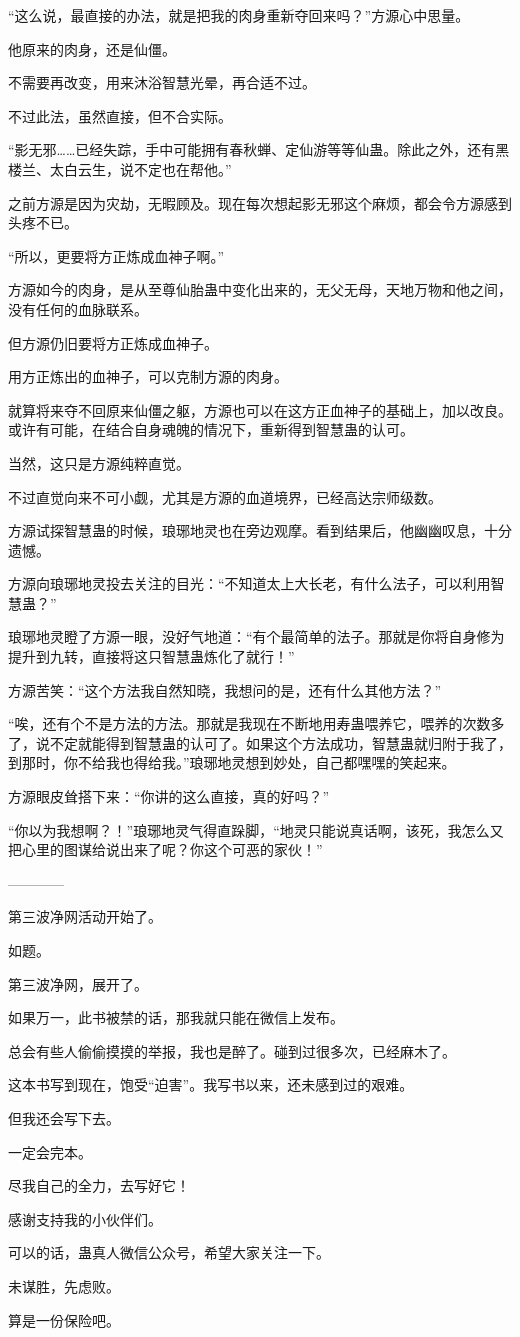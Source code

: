 \begin{this_body}
“这么说，最直接的办法，就是把我的肉身重新夺回来吗？”方源心中思量。

他原来的肉身，还是仙僵。

不需要再改变，用来沐浴智慧光晕，再合适不过。

不过此法，虽然直接，但不合实际。

“影无邪……已经失踪，手中可能拥有春秋蝉、定仙游等等仙蛊。除此之外，还有黑楼兰、太白云生，说不定也在帮他。”

之前方源是因为灾劫，无暇顾及。现在每次想起影无邪这个麻烦，都会令方源感到头疼不已。

“所以，更要将方正炼成血神子啊。”

方源如今的肉身，是从至尊仙胎蛊中变化出来的，无父无母，天地万物和他之间，没有任何的血脉联系。

但方源仍旧要将方正炼成血神子。

用方正炼出的血神子，可以克制方源的肉身。

就算将来夺不回原来仙僵之躯，方源也可以在这方正血神子的基础上，加以改良。或许有可能，在结合自身魂魄的情况下，重新得到智慧蛊的认可。

当然，这只是方源纯粹直觉。

不过直觉向来不可小觑，尤其是方源的血道境界，已经高达宗师级数。

方源试探智慧蛊的时候，琅琊地灵也在旁边观摩。看到结果后，他幽幽叹息，十分遗憾。

方源向琅琊地灵投去关注的目光：“不知道太上大长老，有什么法子，可以利用智慧蛊？”

琅琊地灵瞪了方源一眼，没好气地道：“有个最简单的法子。那就是你将自身修为提升到九转，直接将这只智慧蛊炼化了就行！”

方源苦笑：“这个方法我自然知晓，我想问的是，还有什么其他方法？”

“唉，还有个不是方法的方法。那就是我现在不断地用寿蛊喂养它，喂养的次数多了，说不定就能得到智慧蛊的认可了。如果这个方法成功，智慧蛊就归附于我了，到那时，你不给我也得给我。”琅琊地灵想到妙处，自己都嘿嘿的笑起来。

方源眼皮耸搭下来：“你讲的这么直接，真的好吗？”

“你以为我想啊？！”琅琊地灵气得直跺脚，“地灵只能说真话啊，该死，我怎么又把心里的图谋给说出来了呢？你这个可恶的家伙！”

------------

第三波净网活动开始了。

如题。

第三波净网，展开了。

如果万一，此书被禁的话，那我就只能在微信上发布。

总会有些人偷偷摸摸的举报，我也是醉了。碰到过很多次，已经麻木了。

这本书写到现在，饱受“迫害”。我写书以来，还未感到过的艰难。

但我还会写下去。

一定会完本。

尽我自己的全力，去写好它！

感谢支持我的小伙伴们。

可以的话，蛊真人微信公众号，希望大家关注一下。

未谋胜，先虑败。

算是一份保险吧。

\end{this_body}

